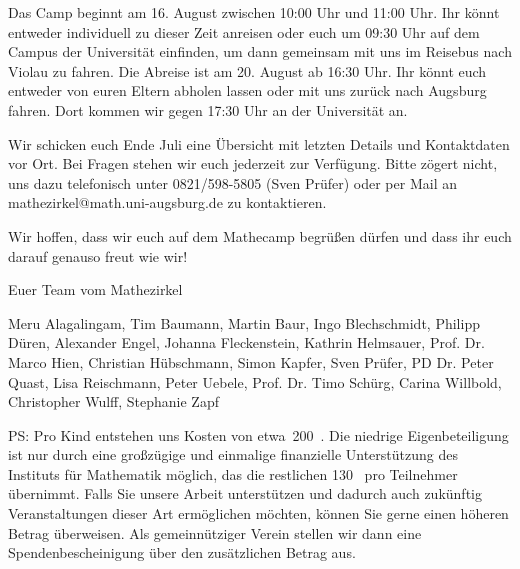 \documentclass[12pt]{zettel}
\begin{document}
Das Camp beginnt am 16. August zwischen 10:00 Uhr und 11:00 Uhr. Ihr könnt
entweder individuell zu dieser Zeit anreisen oder euch um 09:30 Uhr auf dem Campus der
Universität einfinden, um dann gemeinsam mit uns im Reisebus nach Violau zu fahren.
Die Abreise ist am 20. August ab 16:30 Uhr. Ihr könnt euch entweder von euren
Eltern abholen lassen oder mit uns zurück nach Augsburg fahren. Dort kommen wir
gegen 17:30 Uhr an der Universität an.

Wir schicken euch Ende Juli eine Übersicht mit
letzten Details und Kontaktdaten vor Ort. Bei Fragen stehen wir euch jederzeit
zur Verfügung. Bitte zögert nicht, uns dazu telefonisch unter 0821/598-5805
(Sven Prüfer) oder per Mail an \textsf{mathezirkel@math.uni-augsburg.de} zu kontaktieren.

Wir hoffen, dass wir
euch auf dem Mathecamp begrüßen dürfen und dass
ihr euch darauf genauso freut wie wir!

\vspace{2em}

Euer Team vom Mathezirkel

{\small Meru Alagalingam, Tim Baumann, Martin Baur, Ingo Blechschmidt, Philipp Düren,
Alexander Engel, Johanna Fleckenstein, Kathrin Helmsauer, Prof. Dr. Marco Hien,
Christian Hübschmann, Simon Kapfer, Sven Prüfer, PD Dr. Peter Quast,
Lisa Reischmann, Peter Uebele, Prof. Dr. Timo Schürg, Carina Willbold,
Christopher Wulff, Stephanie Zapf}

\vfill

PS: Pro Kind entstehen uns Kosten von etwa~200~\texteuro. Die niedrige
Eigenbeteiligung ist nur durch eine großzügige und einmalige finanzielle
Unterstützung des Instituts für Mathematik möglich, das die restlichen
130~\texteuro{} pro Teilnehmer übernimmt. Falls Sie unsere Arbeit unterstützen
und dadurch auch zukünftig Veranstaltungen dieser Art ermöglichen möchten,
können Sie gerne einen höheren Betrag überweisen. Als gemeinnütziger Verein
stellen wir dann eine Spendenbescheinigung über den zusätzlichen Betrag aus.
\end{document}
